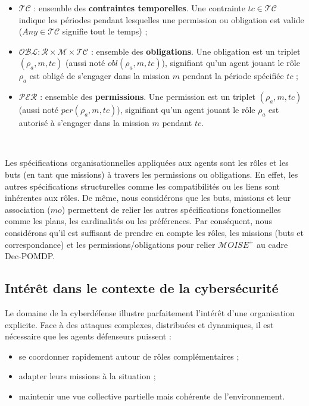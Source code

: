 \begin{itemize}
    \item $\mathcal{TC}$ : ensemble des \textbf{contraintes temporelles}. Une contrainte $tc \in \mathcal{TC}$ indique les périodes pendant lesquelles une permission ou obligation est valide ($Any \in \mathcal{TC}$ signifie tout le temps) ;
    \item $\mathcal{OBL}: \mathcal{R} \times \mathcal{M} \times \mathcal{TC}$ : ensemble des \textbf{obligations}. Une obligation est un triplet $(\rho_a, m, tc)$ (aussi noté $obl(\rho_a, m, tc)$), signifiant qu'un agent jouant le rôle $\rho_a$ est obligé de s'engager dans la mission $m$ pendant la période spécifiée $tc$ ;
    \item $\mathcal{PER}$ : ensemble des \textbf{permissions}. Une permission est un triplet $(\rho_a, m, tc)$ (aussi noté $per(\rho_a, m, tc)$), signifiant qu'un agent jouant le rôle $\rho_a$ est autorisé à s'engager dans la mission $m$ pendant $tc$.
\end{itemize}

\

\noindent Les spécifications organisationnelles appliquées aux agents sont les rôles et les buts (en tant que missions) à travers les permissions ou obligations. En effet, les autres spécifications structurelles comme les compatibilités ou les liens sont inhérentes aux rôles. De même, nous considérons que les buts, missions et leur association ($mo$) permettent de relier les autres spécifications fonctionnelles comme les plans, les cardinalités ou les préférences.  
Par conséquent, nous considérons qu'il est suffisant de prendre en compte les rôles, les missions (buts et correspondance) et les permissions/obligations pour relier $\mathcal{M}OISE^+$ au cadre \ac{Dec-POMDP}.



\subsection{Intérêt dans le contexte de la cybersécurité}

Le domaine de la cyberdéfense illustre parfaitement l'intérêt d'une organisation explicite. Face à des attaques complexes, distribuées et dynamiques, il est nécessaire que les agents défenseurs puissent :
\begin{itemize}
    \item se coordonner rapidement autour de rôles complémentaires ;
    \item adapter leurs missions à la situation ;
    \item maintenir une vue collective partielle mais cohérente de l'environnement.
\end{itemize}

